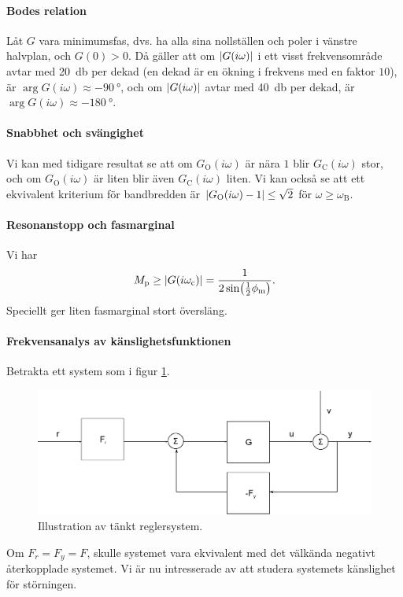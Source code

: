 \paragraph{Bodes relation}
Låt $G$ vara minimumsfas, dvs. ha alla sina nollställen och poler i vänstre halvplan, och $G(0) > 0$. Då gäller att om $\abs{G(i\omega)}$ i ett visst frekvensområde avtar med \SI{20}{\decibel} per dekad (en dekad är en ökning i frekvens med en faktor $10$), är $\arg{G(i\omega)}\approx \SI{-90}{\degree}$, och om $\abs{G(i\omega)}$ avtar med \SI{40}{\decibel} per dekad, är $\arg{G(i\omega)}\approx \SI{-180}{\degree}$.

\paragraph{Snabbhet och svängighet}
Vi kan med tidigare resultat se att om $G_{\text{O}}(i\omega)$ är nära $1$ blir $G_{\text{C}}(i\omega)$ stor, och om $G_{\text{O}}(i\omega)$ är liten blir även $G_{\text{C}}(i\omega)$ liten. Vi kan också se att ett ekvivalent kriterium för bandbredden är $\abs{G_{\text{O}}(i\omega) - 1} \leq \sqrt{2}$ för $\omega \geq \omega_{\text{B}}$.

\paragraph{Resonanstopp och fasmarginal}
Vi har
\begin{align*}
	M_{\text{p}} \geq \abs{G(i\omega_{\text{c}})} = \frac{1}{2\sin(\frac{1}{2}\phi_{\text{m}})}.
\end{align*}
Speciellt ger liten fasmarginal stort översläng.

\paragraph{Frekvensanalys av känslighetsfunktionen}
Betrakta ett system som i figur \ref{fig:negative_feedback_equiv}.
\begin{figure}[!ht]
	\centering
	\includegraphics[width = \textwidth]{./Images/negative_feedback_equiv.eps}
	\caption{Illustration av tänkt reglersystem.}
	\label{fig:negative_feedback_equiv}
\end{figure}
Om $F_{r} = F_{y} = F$, skulle systemet vara ekvivalent med det välkända negativt återkopplade systemet. Vi är nu intresserade av att studera systemets känslighet för störningen.

